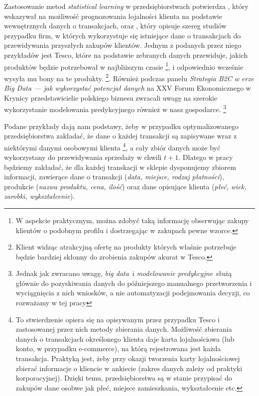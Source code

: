 \documentclass[polish, twoside, 12pt, a4paper]{article}
\theoremstyle{definition}
\theoremstyle{plain}
\theoremstyle{remark}
\begin{document}
Zastosowanie metod \textit{statistical learning} w przedsiębiorstwach potwierdza \cite{Buckinx2007}, który wskazywał na możliwość prognozowania lojalności klienta na podstawie wewnętrznych danych o transakcjach, oraz \cite{Davenport2011}, który opisuje szereg studiów przypadku firm, w których wykorzystuje się istniejące dane o transakcjach do przewidywania przyszłych zakupów klientów. Jednym z podanych przez niego przykładów jest Tesco, które na podstawie zebranych danych przewiduje, jakich produktów będzie potrzebował w najbliższym czasie \footnote{W aspekcie praktycznym, można zdobyć taką informację obserwując zakupy klientów o podobnym profilu i dostrzegając w zakupach pewne wzorce.}, i odpowiednio wcześnie wysyła mu bony na te produkty. \footnote{Klient widząc atrakcyjną ofertę na produkty których właśnie potrzebuje będzie bardziej skłonny do zrobienia zakupów akurat w Tesco.}. Również podczas panelu \textit{Strategia B2C w erze Big Data --- jak wykorzystać potencjał danych} na XXV Forum Ekonomicznego w Krynicy przedstawicielie polskiego biznesu zwracali uwagę na szerokie wykorzystanie modelowania predykcyjnego również w nasz gospodarce. \footnote{Jednak jak zwracano uwagę, \textit{big data}\ i \textit{modelowanie predykcyjne}\ służą głównie do pozyskiwania danych do późniejszego manualnego przetworzenia i wyciągnięcia z nich wniosków, a nie automatyzacji podejmowania decyzji, co rozważamy w tej pracy}

Podane przykłady dają nam podstawy, żeby w przypadku optymalizowanego przedsiębiorstwa zakładać, że dane o każdej transakcji są zapisywane wraz z niektórymi danymi osobowymi klienta \footnote{To stwierdzenie opiera się na opisywanym przez \cite{Davenport2011} przypadku Tesco i zastosowanej przez nich metody zbierania danych. Możliwość zbierania danych o transakcjach określonego klienta daje karta lojalnościowa (lub konto, w przypadku e-commerce), na którą rejestrowana jest każda transakcja. Praktyką jest, żeby przy okazji tworzenia karty lojalnościowej zbierać informacje o kliencie w ankiecie (zakres danych zależy od praktyki korporacyjnej). Dzięki temu, przedsiębiorstwa są w stanie przypisać do zakupów dane osobwe jak płeć, miejsce zamieszkania, wykształcenie etc.}, a cały zbiór danych może być wykorzystany do przewidywania sprzedaży w chwili $t + 1$. Dlatego w pracy będziemy zakładać, że dla każdej transkacji w sklepie dysponujemy zbiorem informacji, zawierące dane o transakcji (\textit{data, miejsce, rodzaj płatności}), produkcie (\textit{nazwa produktu, cena, ilość}) oraz dane opisujące klienta (\textit{płeć, wiek, zarobki, wykształcenie}).
\end{document}
